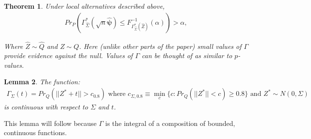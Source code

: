 \documentclass{article}
\newtheorem{theorem}{Theorem}
\newtheorem{lemma}[theorem]{Lemma}
\newcommand{\vmat}{\Sigma}
\newcommand{\disto}{P}
\newcommand{\rvv}{Z}
\newcommand{\distv}{Q}
\begin{document}
\begin{theorem}

Under local alternatives described above, 
\begin{align*}
	Pr_{\disto}\left(\Gamma^*_{\hat{\vmat}}(\sqrt{n}\hat{\boldsymbol{\psi}}) \leq F^{-1}_{\Gamma^*_{\hat{\vmat}}(\hat{\rvv})}(\alpha)\right) > \alpha,
\end{align*}
 
Where $\hat{\rvv} \sim \hat{\distv}$ and $\rvv \sim \distv$. Here (unlike other parts of the paper) small values of $\Gamma$ provide evidence against the null.  Values of $\Gamma$ can be thought of as similar to $p$-values.
\end{theorem}

\begin{lemma}
	\label{lemma:cont_of_gam}
	The function:
	\begin{align*}
		\Gamma_{\Sigma}(t) = Pr_\distv(||\rvv^* + t|| > c_{0.8})  \text{ where }  c_{\vmat, 0.8} \equiv \min_{c}\{c : Pr_\distv(||\rvv^*|| < c) \geq 0.8 \} \text{ and } \rvv^* \sim N(0, \Sigma)
	\end{align*}
	is continuous with respect to $\Sigma$ and $t$.  
\end{lemma}

This lemma will follow because $\Gamma$ is the integral of a composition of bounded, continuous functions.   
\end{document}
